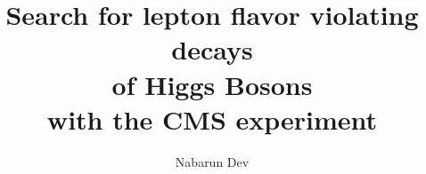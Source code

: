 \documentclass[final,numrefs,sort&compress]{nddiss2e}
\begin{document}
\frontmatter %

\title{Search for lepton flavor violating decays \protect\\ of Higgs Bosons \protect\\ with the CMS experiment}
\author{Nabarun Dev}

\maketitle
%
%

\makepublicdomain
\end{document}
